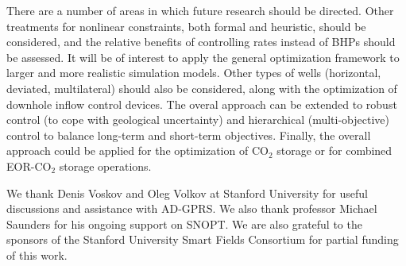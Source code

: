 \documentclass[twocolumn,numbook]{svjour3}          %
\begin{document}
There are a number of areas in which future research should be directed. Other
treatments for nonlinear constraints, both formal and heuristic, should be
considered, and the relative benefits of controlling rates instead of BHPs
should be assessed. It will be of interest to apply the general optimization
framework to larger and more realistic simulation models. Other types of wells
(horizontal, deviated, multilateral) should also be considered, along with the
optimization of downhole inflow control devices. The overal approach can be 
extended to robust control (to cope with geological uncertainty) and hierarchical
(multi-objective) control to balance long-term and short-term objectives. Finally, the overall approach
could be applied for the optimization of CO$_2$ storage or for combined
EOR-CO$_2$ storage operations.



\begin{acknowledgements} 
We thank Denis Voskov and Oleg Volkov at Stanford
University for useful discussions and assistance with AD-GPRS.
We also thank professor Michael Saunders for his ongoing support 
on SNOPT. We are also grateful
to the sponsors of the Stanford University Smart Fields Consortium for partial
funding of this work.
\end{acknowledgements}




\end{document}
